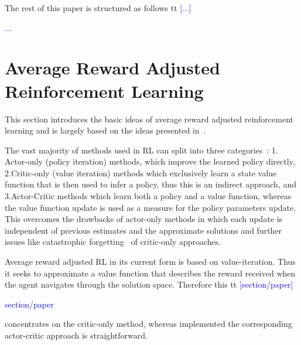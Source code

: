 \documentclass[envcountsame]{llncs}
\newcommand\MS[2][r]{\ifx t#1 \textcolor{blue}{[#2]}%
\else \begin{center}\textcolor{blue}{#2} \end{center} \fi}%
\begin{document}

The rest of this paper is structured as follows \MS[t]{...}

\section{Average Reward Adjusted Reinforcement Learning}

This section introduces the basic ideas of average reward adjusted reinforcement learning and is
largely based on the ideas presented in~\cite{schneckenreither2020average}.

The vast majority of methods used in RL can split into three categories~\cite{konda2000actor}: 1.\@
Actor-only (policy iteration) methods, which improve the learned policy directly, 2.\@ Critic-only
(value iteration) methods which exclusively learn a state value function that is then used to infer
a policy, thus this is an indirect approach, and 3.\@ Actor-Critic methods which learn both a policy
and a value function, whereas the value function update is used as a measure for the policy
parameters update. This overcomes the drawbacks of actor-only methods in which each update is
independent of previous estimates and the approximate solutions and further issues like catastrophic
forgetting~\cite{french1999catastrophic} of critic-only approaches.

Average reward adjusted RL in its current form is based on value-iteration. Thus it seeks to
approximate a value function that describes the reward received when the agent navigates through the
solution space. Therefore this \MS[t]{section/paper} concentrates on the critic-only method, whereas
implemented the corresponding actor-critic approach is straightforward.
\end{document}
